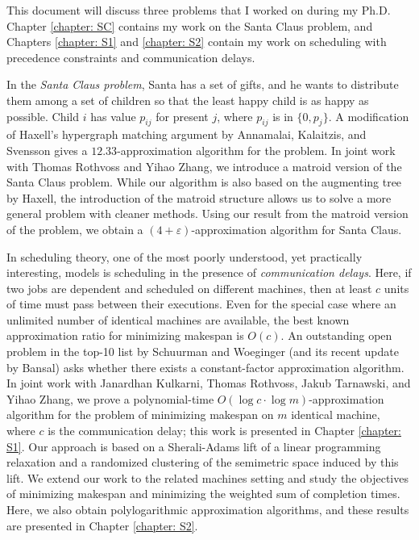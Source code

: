 
This document will discuss three problems that I worked on during my Ph.D. 
Chapter \ref{chapter: SC} contains my work on the Santa Claus problem, and
 Chapters \ref{chapter: S1} and \ref{chapter: S2} contain my work on scheduling with precedence constraints and communication delays.

In the \emph{Santa Claus problem}, Santa has a set of gifts, and he wants to distribute them among a set of children
so that the least happy child is as happy as possible. 
Child $i$ has value $p_{ij}$ for present $j$, where $p_{ij}$ is in $ \{ 0,p_j\}$.
A modification of Haxell's hypergraph matching argument by Annamalai, Kalaitzis, and Svensson gives a $12.33$-approximation algorithm for the problem.
In joint work with Thomas Rothvoss and Yihao Zhang, we introduce a matroid version of the Santa Claus problem. 
While our algorithm is also based on the augmenting tree by Haxell, the introduction
of the matroid structure allows us to solve a more general problem with cleaner methods.
Using our result from the matroid version of the problem, we obtain a $(4+\varepsilon)$-approximation algorithm for Santa Claus.

In scheduling theory, one of the most poorly understood, yet practically interesting, models is scheduling
in the presence of \emph{communication delays}.
Here,
if two jobs are dependent and scheduled on different machines,
then at least $c$ units of time must pass between their executions.
Even for the special case where an unlimited number of identical machines are available, the best known approximation ratio
for minimizing makespan is $O(c)$.
An outstanding open problem in the top-10 list by Schuurman and Woeginger (and its recent update by Bansal)
asks whether there exists a constant-factor approximation algorithm.
In joint work with Janardhan Kulkarni, Thomas Rothvoss, Jakub Tarnawski, and Yihao Zhang,
 we prove a polynomial-time $O(\log c \cdot \log m)$-approximation algorithm
for the problem of minimizing makespan
on $m$ identical machine, where $c$ is the communication delay; this work is presented in Chapter \ref{chapter: S1}.
Our approach is based on a Sherali-Adams lift of a linear programming relaxation
and a randomized clustering of the semimetric space induced by this lift. 
We extend our work to the related machines setting and study the objectives of minimizing makespan 
and minimizing the weighted sum of completion times. 
Here, we also obtain polylogarithmic approximation algorithms, and these results are presented in Chapter \ref{chapter: S2}.